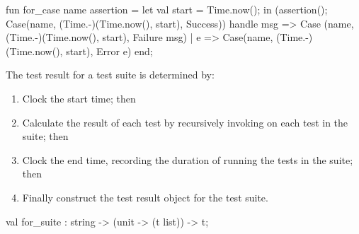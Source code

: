 \nwenddocs{}\plusendmoddef\nwstartdeflinemarkup{}\nwenddeflinemarkup
fun for_case name assertion =
  let
    val start = Time.now();
  in
    (assertion();
     Case(name,
          (Time.-)(Time.now(), start),
          Success))
    handle  msg =>
           Case (name,
                 (Time.-)(Time.now(), start),
                 Failure msg)
         | e => Case(name,
                     (Time.-)(Time.now(), start),
                     Error e)
  end;
\eatline
{}\nwendcode{}\nwdocspar
\begin{node}
The test result for a test suite is determined by:
\begin{enumerate}
\item Clock the start time; then
\item Calculate the result of each test by recursively invoking
  {\Tt{}\nwendquote} on each test in the suite; then
\item Clock the end time, recording the duration of running the tests
  in the suite; then
\item Finally construct the test result object for the test suite.
\end{enumerate}
\end{node}

\nwenddocs{}\plusendmoddef\nwstartdeflinemarkup{}\nwenddeflinemarkup
val for_suite : string -> (unit -> (t list)) -> t;
\nwendcode{}\nwdocspar

